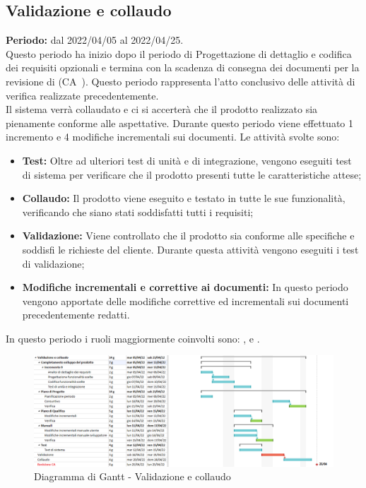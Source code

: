 
\subsection{Validazione e collaudo} \label{subsection:pianificazione_validazione}
  \textbf{Periodo:} dal 2022/04/05 al 2022/04/25.
  \bigskip
  \\Questo periodo ha inizio dopo il periodo di Progettazione di dettaglio e codifica dei requisiti opzionali e termina con la scadenza di consegna dei documenti per la revisione di \CA (CA\glo\ ).
  Questo periodo rappresenta l'atto conclusivo delle attività di verifica realizzate precedentemente.
  \\Il sistema verrà collaudato e ci si accerterà che il prodotto realizzato
  sia pienamente conforme alle aspettative.
  Durante questo periodo viene effettuato 1 incremento e 4 modifiche incrementali sui documenti. 
  Le attività svolte sono:
  \begin{itemize}
    \item \textbf{Test:} Oltre ad ulteriori test di unità e di integrazione, vengono eseguiti test di sistema per verificare che il prodotto presenti tutte le caratteristiche attese;
    \item \textbf{Collaudo:} Il prodotto viene eseguito e testato in tutte le sue funzionalità, verificando che siano stati soddisfatti tutti i requisiti;
    \item \textbf{Validazione:} Viene controllato che il prodotto sia conforme alle specifiche e soddisfi le richieste del cliente.
    Durante questa attività vengono eseguiti i test di validazione;
    \item \textbf{Modifiche incrementali e correttive ai documenti:} In questo periodo vengono apportate delle modifiche correttive ed incrementali sui documenti precedentemente redatti.
  \end{itemize}
  In questo periodo i ruoli maggiormente coinvolti sono: \roleDesignerLow{}, \roleProgrammerLow{} e \roleVerifierLow{}.
  \bigskip
  \begin{figure}[H]
    \centering
     \includegraphics[scale=0.54]{immagini/validazione_collaudo.png}
     \caption{Diagramma di Gantt - Validazione e collaudo}
   \end{figure}
   \pagebreak